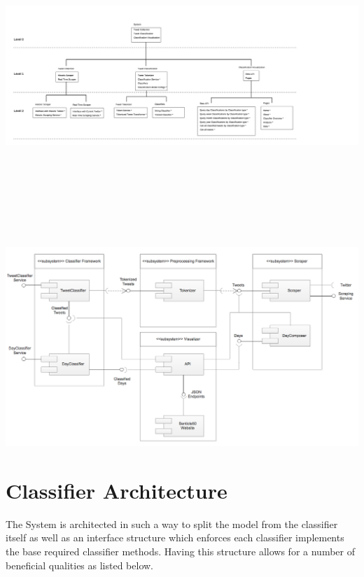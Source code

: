 \documentclass[11pt]{report}
\begin{document}
\begin{landscape} 
  \hspace*{0cm}
  \includegraphics[width=22.5cm,height=12cm]{images/top-down-final.png}
  \label{fig:top-down}        
\end{landscape}


\begin{landscape}
\begin{center}
  \includegraphics[width=\linewidth]{images/component-diagram.png}
  \label{fig:component}
\end{center}
\end{landscape}

\section{Classifier Architecture}
The System is architected in such a way to split the model from the classifier itself as well as an interface structure which enforces each classifier implements the base required classifier methods. Having this structure allows for a number of beneficial qualities as listed below.
\end{document}
